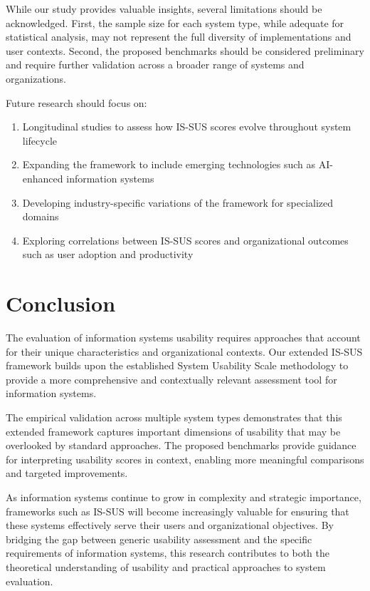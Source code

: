\documentclass[blindrev]{informs3}
\begin{document}
While our study provides valuable insights, several limitations should be acknowledged. First, the sample size for each system type, while adequate for statistical analysis, may not represent the full diversity of implementations and user contexts. Second, the proposed benchmarks should be considered preliminary and require further validation across a broader range of systems and organizations.

Future research should focus on:

\begin{enumerate}
    \item Longitudinal studies to assess how IS-SUS scores evolve throughout system lifecycle
    \item Expanding the framework to include emerging technologies such as AI-enhanced information systems
    \item Developing industry-specific variations of the framework for specialized domains
    \item Exploring correlations between IS-SUS scores and organizational outcomes such as user adoption and productivity
\end{enumerate}

\section{Conclusion}\label{conclusion}

The evaluation of information systems usability requires approaches that account for their unique characteristics and organizational contexts. Our extended IS-SUS framework builds upon the established System Usability Scale methodology to provide a more comprehensive and contextually relevant assessment tool for information systems.

The empirical validation across multiple system types demonstrates that this extended framework captures important dimensions of usability that may be overlooked by standard approaches. The proposed benchmarks provide guidance for interpreting usability scores in context, enabling more meaningful comparisons and targeted improvements.

As information systems continue to grow in complexity and strategic importance, frameworks such as IS-SUS will become increasingly valuable for ensuring that these systems effectively serve their users and organizational objectives. By bridging the gap between generic usability assessment and the specific requirements of information systems, this research contributes to both the theoretical understanding of usability and practical approaches to system evaluation.
\end{document}
